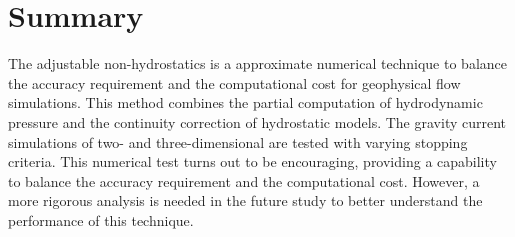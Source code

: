 \normalsize
\section{Summary}

The adjustable non-hydrostatics is a approximate numerical technique to balance the accuracy requirement and the computational cost for geophysical flow simulations. This method combines the partial computation of hydrodynamic pressure and the continuity correction of hydrostatic models. The gravity current simulations of two- and three-dimensional are tested with varying stopping criteria. This numerical test turns out to be encouraging, providing a capability to balance the accuracy requirement and the computational cost. However, a more rigorous analysis is needed in the future study to better understand the performance of this technique. 
